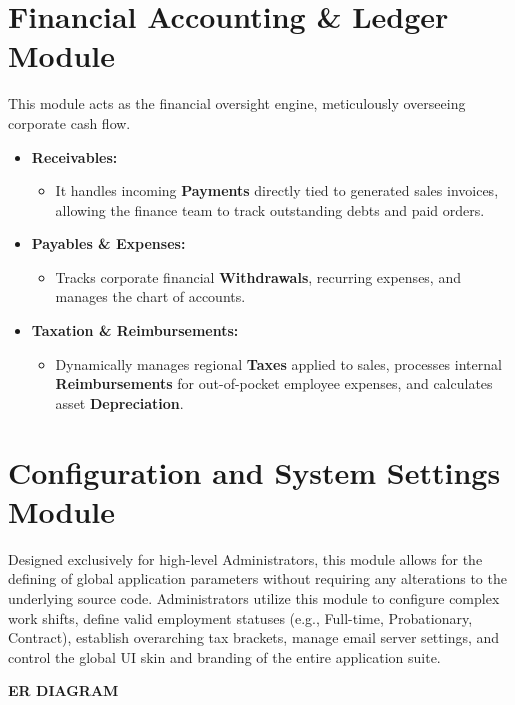 ﻿\documentclass[12pt,a4paper]{report}
\begin{document}
\section*{Financial Accounting \& Ledger Module}
This module acts as the financial oversight engine, meticulously overseeing corporate cash flow.
\begin{itemize}
    \item \textbf{Receivables:}
    \begin{itemize}
        \item It handles incoming \textbf{Payments} directly tied to generated sales invoices, allowing the finance team to track outstanding debts and paid orders.
    \end{itemize}
    \item \textbf{Payables \& Expenses:}
    \begin{itemize}
        \item Tracks corporate financial \textbf{Withdrawals}, recurring expenses, and manages the chart of accounts.
    \end{itemize}
    \item \textbf{Taxation \& Reimbursements:}
    \begin{itemize}
        \item Dynamically manages regional \textbf{Taxes} applied to sales, processes internal \textbf{Reimbursements} for out-of-pocket employee expenses, and calculates asset \textbf{Depreciation}.
    \end{itemize}
\end{itemize}

\section*{Configuration and System Settings Module}
Designed exclusively for high-level Administrators, this module allows for the defining of global application parameters without requiring any alterations to the underlying source code. Administrators utilize this module to configure complex work shifts, define valid employment statuses (e.g., Full-time, Probationary, Contract), establish overarching tax brackets, manage email server settings, and control the global UI skin and branding of the entire application suite.

\newpage
\vspace*{\fill}
\begin{center}
{\LARGE \textbf{ER DIAGRAM}}
\end{center}
\vspace*{\fill}
\end{document}
